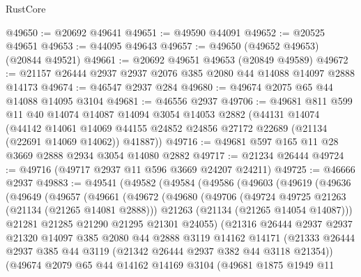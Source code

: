 \begin{lexlean}{RustCore}
\begin{coremodule}
@49650 := @20692 @49641
@49651 := @49590 @44091
@49652 := @20525 @49651
@49653 := @44095 @49643
@49657 := @49650 (@49652 @49653) (@20844 @49521)
@49661 := @20692 @49651 @49653 (@20849 @49589)
@49672 := @21157 @26444 @2937 @2937 @2076 @385 @2080 @44 @14088 @14097 @2888 @14173
@49674 := @46547 @2937 @284
@49680 := @49674 @2075 @65 @44 @14088 @14095 @3104
@49681 := @46556 @2937
@49706 := @49681
    @811
    @599
    @11
    @40
    @14074
    @14087
    @14094
    @3054
    @14053
    @2882
    (@44131
      @14074
      (@44142
        @14061
        @14069
        @44155
        @24852
        @24856
        @27172
        @22689
        (@21134 (@22691 @14069 @14062))
        @41887))
@49716 := @49681 @597 @165 @11 @28 @3669 @2888 @2934 @3054 @14080 @2882
@49717 := @21234 @26444
@49724 := @49716 (@49717 @2937 @11 @596 @3669 @24207 @24211)
@49725 := @46666 @2937
@49883 := @49541
    (@49582
      (@49584
        (@49586
          (@49603
            (@49619
              (@49636
                (@49649
                  (@49657
                    (@49661
                      (@49672
                        (@49680
                          (@49706
                            (@49724 @49725 @21263 (@21134 (@21265 @14081 @2888)))
                            @21263
                            (@21134 (@21265 @14054 @14087)))
                          @21281
                          @21285
                          @21290
                          @21295
                          @21301
                          @24055)
                        (@21316
                          @26444
                          @2937
                          @2937
                          @21320
                          @14097
                          @385
                          @2080
                          @44
                          @2888
                          @3119
                          @14162
                          @14171
                          (@21333
                            @26444
                            @2937
                            @385
                            @44
                            @3119
                            (@21342 @26444 @2937 @382 @44 @3118 @21354))
                          (@49674
                            @2079
                            @65
                            @44
                            @14162
                            @14169
                            @3104
                            (@49681
                              @1875
                              @1949
                              @11

\end{coremodule}
\end{lexlean}
